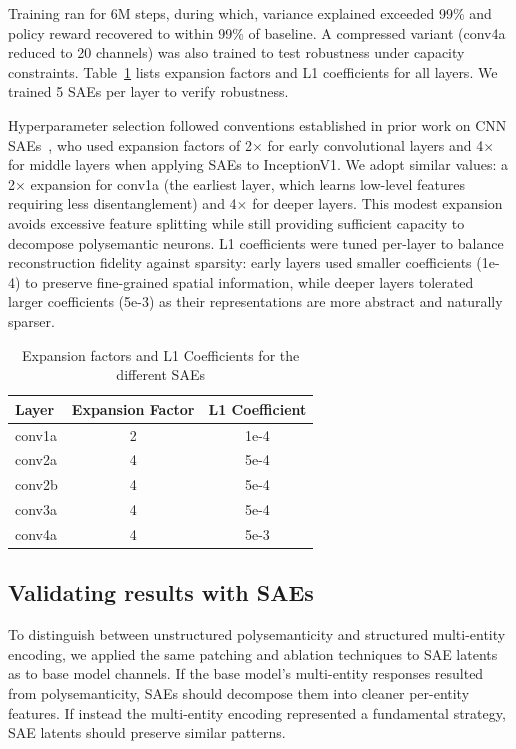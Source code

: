     Training ran for 6M steps, during which, variance explained exceeded 99\% and policy reward recovered to within 99\% of baseline. A compressed variant (conv4a reduced to 20 channels) was also trained to test robustness under capacity constraints. Table~\ref{tab:sae-params-methodology} lists expansion factors and L1 coefficients for all layers. We trained 5 SAEs per layer to verify robustness.

Hyperparameter selection followed conventions established in prior work on CNN SAEs~\citet{gorton_2024_missing}, who used expansion factors of 2$\times$ for early convolutional layers and 4$\times$ for middle layers when applying SAEs to InceptionV1. We adopt similar values: a 2$\times$ expansion for conv1a (the earliest layer, which learns low-level features requiring less disentanglement) and 4$\times$ for deeper layers. This modest expansion avoids excessive feature splitting while still providing sufficient capacity to decompose polysemantic neurons. L1 coefficients were tuned per-layer to balance reconstruction fidelity against sparsity: early layers used smaller coefficients (1e-4) to preserve fine-grained spatial information, while deeper layers tolerated larger coefficients (5e-3) as their representations are more abstract and naturally sparser.

    \begin{table}[H] %
    \caption[SAE hyperparameters by layer]{Expansion factors and L1 Coefficients for the different SAEs}
    \label{tab:sae-params-methodology} %
    \centering
    \begin{tabular}{@{}lcc@{}}
    \toprule
    Layer & Expansion Factor & L1 Coefficient \\
    \midrule
    conv1a & 2 & 1e-4 \\
    conv2a & 4 & 5e-4 \\
    conv2b & 4 & 5e-4 \\
    conv3a & 4 & 5e-4 \\
    conv4a & 4 & 5e-3 \\
    \bottomrule
    \end{tabular}
    \end{table}

    \subsection{Validating results with SAEs}
    \label{subsubsec:polysemanticity_investigation}
    To distinguish between unstructured polysemanticity and structured multi-entity encoding, we applied the same patching and ablation techniques to SAE latents as to base model channels. If the base model's multi-entity responses resulted from polysemanticity, SAEs should decompose them into cleaner per-entity features. If instead the multi-entity encoding represented a fundamental strategy, SAE latents should preserve similar patterns.

